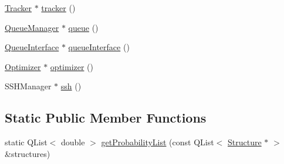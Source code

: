 \begin{DoxyCompactItemize}
\item 
\hyperlink{classGlobalSearch_1_1Tracker}{Tracker} $\ast$ \hyperlink{classGlobalSearch_1_1OptBase_a304d0d10064bd3913c8089aca76067d6}{tracker} ()
\item 
\hyperlink{classGlobalSearch_1_1QueueManager}{Queue\-Manager} $\ast$ \hyperlink{classGlobalSearch_1_1OptBase_aa10982ae8ea63745203a025b2be8054d}{queue} ()
\item 
\hyperlink{classGlobalSearch_1_1QueueInterface}{Queue\-Interface} $\ast$ \hyperlink{classGlobalSearch_1_1OptBase_a73faf60edcd3db57538349f5a636576e}{queue\-Interface} ()
\item 
\hyperlink{classGlobalSearch_1_1Optimizer}{Optimizer} $\ast$ \hyperlink{classGlobalSearch_1_1OptBase_a4dce62d15f24d665c807047aa5c618fc}{optimizer} ()
\item 
S\-S\-H\-Manager $\ast$ \hyperlink{classGlobalSearch_1_1OptBase_a40064a3c1e6d0acae26b1908a8bdf5db}{ssh} ()
\end{DoxyCompactItemize}
\subsection*{Static Public Member Functions}
\begin{DoxyCompactItemize}
\item 
static Q\-List$<$ double $>$ \hyperlink{classGlobalSearch_1_1OptBase_a863b23c21cf06829e39420fcc94f0348}{get\-Probability\-List} (const Q\-List$<$ \hyperlink{classGlobalSearch_1_1Structure}{Structure} $\ast$ $>$ \&structures)
\end{DoxyCompactItemize}
